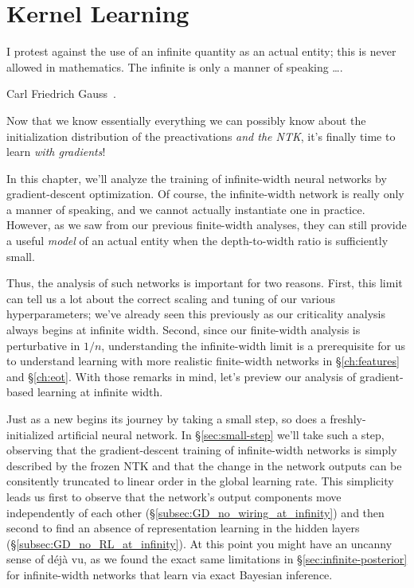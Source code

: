 
\chapter{Kernel Learning}\label{ch:NTHb}
\epigraph{I protest against the use of an infinite quantity as an actual entity; this is never allowed in mathematics. The infinite is only a manner of speaking \dots .}{Carl Friedrich Gauss~\cite{gaussquote}.}

\noindent{}Now that we know essentially everything we can possibly know about the initialization distribution of the preactivations \emph{and the NTK}, it's finally time to learn \emph{with gradients}!

In this chapter, we'll analyze the training of infinite-width neural networks by gradient-descent optimization. Of course, the infinite-width network is really only a manner of speaking, and we cannot actually instantiate one in practice. However, as we saw from our previous finite-width analyses, they can still provide a useful \emph{model} of an actual entity when the depth-to-width ratio 
is sufficiently small.

Thus, the analysis of such networks is important for two reasons. First, this limit can tell us a lot about the correct scaling and tuning of our various hyperparameters; we've already seen this previously as our criticality analysis always begins at infinite width. Second, since our finite-width analysis is perturbative in $1/n$, understanding the infinite-width limit is a prerequisite for us to understand learning with more realistic finite-width networks in \S\ref{ch:features} and \S\ref{ch:eot}. 
With those remarks in mind, let's preview our analysis of gradient-based learning at infinite width.









Just as a new  begins its journey by taking a small step, so does a freshly-initialized artificial neural network. In \S\ref{sec:small-step} we'll take such a step, observing that the gradient-descent training of infinite-width networks is simply described by the frozen NTK and that the change in the network outputs can be consitently truncated to linear order in the global learning rate.
This simplicity leads us first to observe that the network's output components move independently of each other  (\S\ref{subsec:GD_no_wiring_at_infinity}) and then second to find an absence of representation learning in the hidden layers (\S\ref{subsec:GD_no_RL_at_infinity}).
At this point you might have an uncanny sense of d\'ej\`a vu, as we found the exact same limitations in \S\ref{sec:infinite-posterior} for infinite-width networks that learn via exact Bayesian inference.







